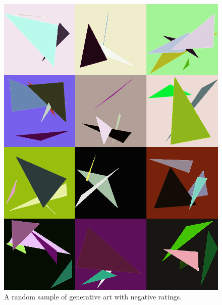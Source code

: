 \documentclass[midd]{thesis}
\begin{document}
\begin{figure}[tp]
\centering
\includegraphics[width=\textwidth]{visualizations/uglygallery-shortened.png}
\caption{A random sample of generative art with negative ratings.}
\label{fig:positive-geneartive-art}
\end{figure}
\end{document}

